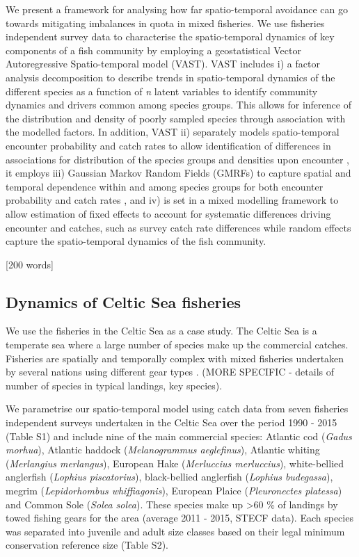 \documentclass{nature}
\begin{document}
\begin{linenumbers}
We present a framework for analysing how far spatio-temporal avoidance can go
towards mitigating imbalances in quota in mixed fisheries. We use fisheries
independent survey data to characterise the spatio-temporal dynamics of key
components of a fish community by employing a geostatistical Vector
Autoregressive Spatio-temporal model (VAST). VAST includes i) a factor analysis
decomposition to describe trends in spatio-temporal dynamics of the different
species as a function of \textit{n} latent variables\cite{Thorson2015} to
identify community dynamics and drivers common among species groups. This
allows for inference of the distribution and density of poorly sampled species
through association with the modelled factors. In addition, VAST ii) separately
models spatio-temporal encounter probability and catch rates to allow
identification of differences in associations for distribution of the species
groups and densities upon encounter \cite{Thorson2015a}, it employs iii)
Gaussian Markov Random Fields (GMRFs) to capture spatial and temporal
dependence within and among species groups for both encounter probability and
catch rates \cite{Thorson2013}, and iv) is set in a mixed modelling framework
to allow estimation of fixed effects to account for systematic differences
driving encounter and catches, such as survey catch rate differences while
random effects capture the spatio-temporal dynamics of the fish community.

[200 words]

\subsection{Dynamics of Celtic Sea fisheries}

We use the fisheries in the Celtic Sea as a case study. The Celtic Sea is a
temperate sea where a large number of species make up the commercial catches.
Fisheries are spatially and temporally complex with mixed fisheries undertaken
by several nations using different gear types \cite{Ellis2000, Gerritsen2012}.
(MORE SPECIFIC - details of number of species in typical landings, key
species).

We parametrise our spatio-temporal model using catch data from seven fisheries
independent surveys undertaken in the Celtic Sea over the period 1990 - 2015
(Table S1) and include nine of the main commercial species: Atlantic cod
(\textit{Gadus morhua}), Atlantic haddock (\textit{Melanogrammus aeglefinus}),
Atlantic whiting (\textit{Merlangius merlangus}), European Hake
(\textit{Merluccius merluccius}), white-bellied anglerfish (\textit{Lophius
	piscatorius}), black-bellied anglerfish (\textit{Lophius budegassa}),
megrim (\textit{Lepidorhombus whiffiagonis}), European Plaice
(\textit{Pleuronectes platessa}) and Common Sole (\textit{Solea solea}). These
species make up \textgreater 60 \% of landings by towed fishing gears for the
area (average 2011 - 2015, STECF data). Each species was separated into
juvenile and adult size classes based on their legal minimum conservation
reference size (Table S2).


\end{linenumbers}
\end{document}
